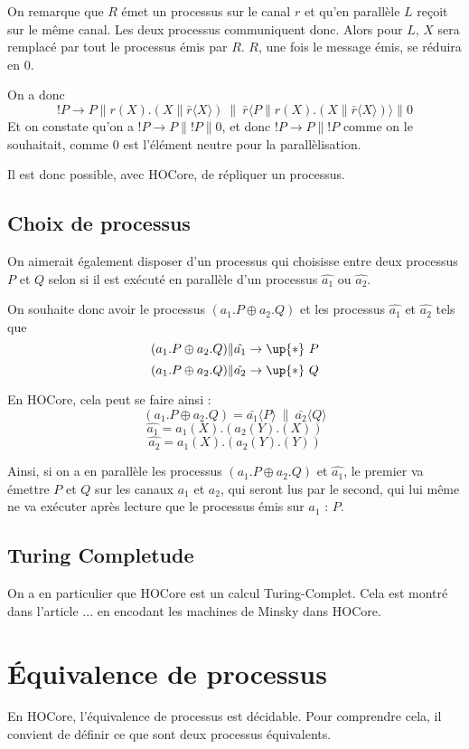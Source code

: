 \documentclass[11pt]{article}
\def\+{\oplus}
\begin{document}
On remarque que $R$ émet un processus sur le canal $r$ et qu'en parallèle $L$ reçoit sur le même canal. Les deux processus communiquent donc. Alors pour $L$, $X$ sera remplacé par tout le processus émis par $R$. $R$, une fois le message émis, se réduira en $0$.

On a donc $$!P\rightarrow P\|r(X).(X\|\bar{r}\langle X\rangle)\ \|\ \bar{r}\langle P\|r(X).(X\|\bar{r}\langle X\rangle)\rangle\| 0$$
Et on constate qu'on a $!P\rightarrow P\|!P\|0$, et donc $!P\rightarrow P\|!P$ comme on le souhaitait, comme $0$ est l'élément neutre pour la parallèlisation.

Il est donc possible, avec HOCore, de répliquer un processus.

\subsection{Choix de processus}
On aimerait également disposer d'un processus qui choisisse entre deux processus $P$ et $Q$ selon si il est exécuté en parallèle d'un processus $\hat{a_1}$ ou $\hat{a_2}$.

On souhaite donc avoir le processus $(a_1.P\+ a_2.Q)$ et les processus $\hat{a_1}$ et $\hat{a_2}$ tels que
$$(a_1.P\+ a_2.Q)\|\hat{a_1}\rightarrow\up{*}\ P$$
$$(a_1.P\+ a_2.Q)\|\hat{a_2}\rightarrow\up{*}\ Q$$

En HOCore, cela peut se faire ainsi :
$$(a_1.P\+ a_2.Q) = \bar{a_1}\langle P\rangle\ \|\ \bar{a_2}\langle Q\rangle$$
$$\hat{a_1} = a_1(X).(a_2(Y).(X))$$
$$\hat{a_2} = a_1(X).(a_2(Y).(Y))$$

Ainsi, si on a en parallèle les processus $(a_1.P\+ a_2.Q)$ et  $\hat{a_1}$, le premier va émettre $P$ et $Q$ sur les canaux $a_1$ et $a_2$, qui seront lus par le second, qui lui même ne va exécuter après lecture que le processus émis sur $a_1$ : $P$. 

\subsection{Turing Completude}
On a en particulier que HOCore est un calcul Turing-Complet. %
Cela est montré dans l'article ... en encodant les machines de Minsky dans HOCore.


\section{Équivalence de processus}
En HOCore, l'équivalence de processus est décidable. Pour comprendre cela, il convient de définir ce que sont deux processus équivalents.
\end{document}

